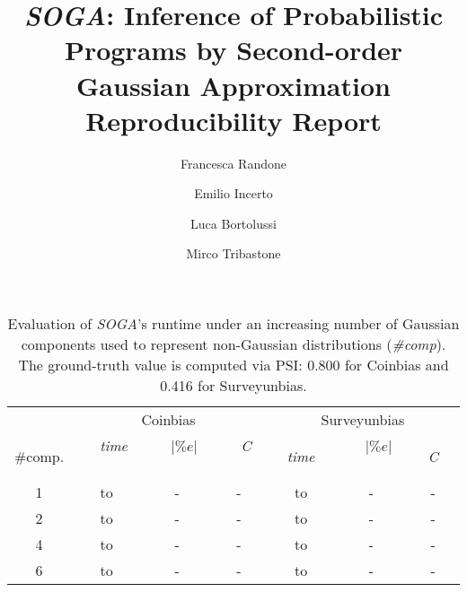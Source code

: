 \documentclass[a4paper]{llncs}
\newcommand{\soga}{\textsl{SOGA}}
\begin{document}
\mainmatter

\title{\soga: Inference of Probabilistic Programs by Second-order Gaussian Approximation Reproducibility Report}


\author{Francesca Randone  \and Emilio Incerto  \and Luca Bortolussi  \and Mirco Tribastone}

\allowdisplaybreaks[0]

\maketitle
\setcounter{table}{3}
\begin{table}[t]
\caption{Evaluation of \soga's runtime under an increasing number of Gaussian components used to represent non-Gaussian distributions (\emph{\#comp}). The ground-truth value is computed via PSI: 0.800 for Coinbias and 0.416 for Surveyunbias.}
\centering
\begin{tabular}{ccccccc}
\toprule
 & \multicolumn{3}{c}{Coinbias} & \multicolumn{3}{c}{Surveyunbias} \\
 \cmidrule(l){2-4}  \cmidrule(l){5-7}
\#comp. & \ \ \emph{time} \ \ & \ \ $|\%e|$ \ \ &\ \  \emph{C} \ \ & \ \ \emph{time}\ \  &\ \  $|\%e|$ \ \ &\ \  \emph{C}\ \   \\
\midrule
1 &to&-&-&to&-&-\\

2 &to&-&-&to&-&-\\

4 &to&-&-&to&-&-\\

6 &to&-&-&to&-&-\\
\bottomrule
\end{tabular}
\label{tab:sendCmp}
\end{table}
\end{document}

